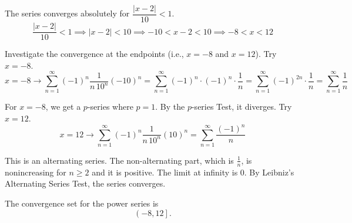 \documentclass[a4paper, 12pt]{article}
\begin{document}
\begin{enumerate}[leftmargin=*,label=\textbf{\arabic*.}]
The series converges absolutely for $\dfrac{|x-2|}{10}<1$.
\[\frac{|x-2|}{10}<1\implies|x-2|<10\implies-10<x-2<10\implies -8<x<12\]

Investigate the convergence at the endpoints (i.e., $x=-8$ and $x=12$). Try $x=-8$.
\[x=-8\rightarrow\sum_{n=1}^{\infty}(-1)^n\frac1{n\,10^n}(-10)^n=\sum_{n=1}^{\infty}(-1)^n\cdot(-1)^n\cdot\frac1{n}=\sum_{n=1}^{\infty}(-1)^{2n}\cdot\frac1n=\sum_{n=1}^{\infty}\frac1n\]

For $x=-8$, we get a $p$-series where $p=1$. By the $p$-series Test, it diverges. Try $x=12$.
\[x=12\rightarrow\sum_{n=1}^{\infty}(-1)^n\frac1{n\,10^n}(10)^n=\sum_{n=1}^{\infty}\frac{(-1)^n}n\]

This is an alternating series. The non-alternating part, which is $\frac1n$, is nonincreasing for $n\geq2$ and it is positive. The limit at infinity is $0$. By Leibniz's Alternating Series Test, the series converges.

The convergence set for the power series is
\[\boxed{\left(-8,12\right]}.\]

\end{enumerate}
\end{document}
